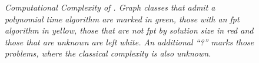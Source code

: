 \begin{center}
\begin{table}[ht]
{\begin{tabularx}{1.5\textwidth}{lllllll}
        
        
        \midrule
        \bottomrule
    \end{tabularx}
}
    \end{table}
\end{center}


\begin{figure}
    \centering
    \resizebox{1.0\textwidth}{!}{
        
    }
    \caption{\textit{Computational Complexity of \sdom. Graph classes that admit a polynomial time algorithm are marked in \textit{green}, those with an fpt algorithm in \textit{yellow}, those that are not fpt by solution size in \textit{red} and those that are unknown are left \textit{white}.
    An additional ``?''  marks those problems, where the classical complexity is also unknown.}}
    
    \label{fig:bigpicture}
\end{figure}

